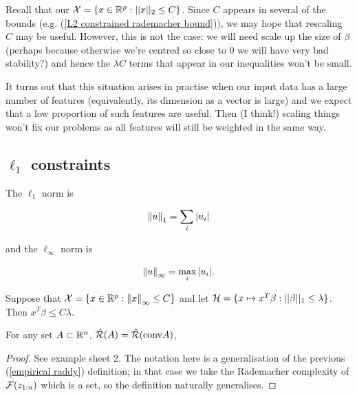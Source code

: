 \documentclass[11pt]{scrartcl}
\begin{document}

Recall that our $\mathcal{X} = \{ x \in \mathbb R^p : ||x||_2 \le C \}$. Since $C$ appears in several of the bounds (e.g. (\ref{L2 constrained rademacher bound})), we may hope that rescaling $C$ may be useful. However, this is not the case: we will need scale up the size of $\beta$ (perhaps because otherwise we're centred so close to 0 we will have very bad stability?) and hence the $\lambda C$ terms that appear in our inequalities won't be small.

It turns out that this situation arises in practise when our input data has a large number of features (equivalently, its dimension as a vector is large) and we expect that a low proportion of such features are useful. Then (I think!) scaling things won't fix our problems as all features will still be weighted in the same way.

\subsection{$\ell_1$ constraints}

\begin{definition}
The $\ell_1$ norm is 

\begin{equation}
    \left\lVert u\right\rVert_1 = \sum_i |u_i|
\end{equation}

and the $\ell_\infty$ norm is

\begin{equation}
    \left\lVert u\right\rVert_\infty = \max_i |u_i|.
\end{equation}
\end{definition}

Suppose that $\mathcal{X} = \{ x \in \mathbb R^p : \left\lVert x\right\rVert_\infty \le C \}$ and let $\mathcal{H} = \{ x \mapsto x^T \beta : ||\beta||_1 \le \lambda \}$. Then $x^T \beta \le C \lambda$. %

\begin{lemma}
\label{es2 lemma}
For any set $A \subset \mathbb R^n$, $\hat{\mathcal{R}}(A) = \hat{\mathcal{R}}(\text{conv} A)$,

\begin{proof}
See example sheet 2. The notation here is a generalisation of the previous (\ref{empirical raddy}) definition; in that case we take the Rademacher complexity of $\mathcal{F}(z_{1:n})$ which is a set, so the definition naturally generalises.
\end{proof}
\end{lemma}
\end{document}
